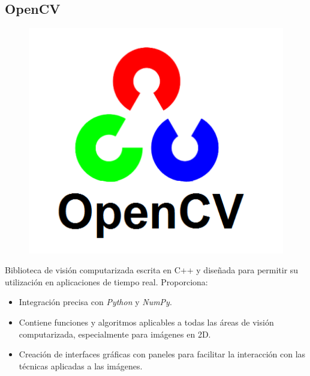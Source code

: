 \subsection{OpenCV}
\begin{figure}[H]
  \hspace*{1.4cm}
  \includegraphics[scale=0.2]{imagenes/logos/opencv_logo.png}
\end{figure}
Biblioteca de visión computarizada escrita en C++ y diseñada para
permitir su utilización en aplicaciones de tiempo real. Proporciona:
\begin{itemize}
\item Integración precisa con \emph{Python} y \emph{NumPy}.
\item Contiene funciones y algoritmos aplicables a todas las áreas de
  visión computarizada, especialmente para imágenes en 2D.
\item Creación de interfaces gráficas con paneles para facilitar la
  interacción con las técnicas aplicadas a las imágenes.
\end{itemize}

